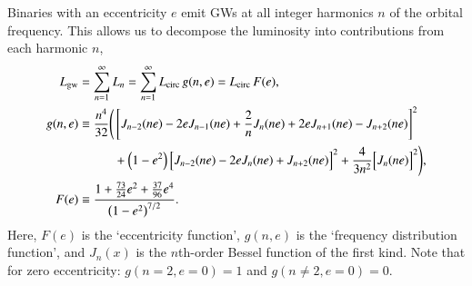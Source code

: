 \documentclass[onecolumn,authoryear]{els-mrw}
\begin{document}
Binaries with an eccentricity $e$ emit GWs at all integer harmonics $n$ of the orbital frequency.  This allows us to decompose the luminosity into contributions from each harmonic $n$,
\begin{subequations}
\begin{align}
    \lumgw & = \sum_{n=1}^\infty L_n = \sum_{n=1}^\infty \lgwcirc \, g(n,e) = \lgwcirc \, F(e), \\
    g(n,e) & \equiv \frac{n^4}{32} \Biggl(
        \begin{aligned}[t]
            & \left[ J_{n-2}(ne) - 2eJ_{n-1}(ne) + \frac{2}{n} J_n (ne) + 2e J_{n+1} (ne) - J_{n+2} (ne) \vphantom{\frac{2}{n}}\right]^2 \\
            & + \left(1-e^2\right) \Bigl[J_{n-2}(ne) - 2eJ_n(ne) + J_{n+2}(ne)\Bigr]^2 + \frac{4}{3n^2}\Bigl[J_n(ne)\Bigr]^2 \Biggr),
        \end{aligned} \\
    F(e) & \equiv \frac{1 + \frac{73}{24} e^2 + \frac{37}{96} e^4}{\left( 1 - e^2\right)^{7/2}}.
\end{align}
\end{subequations}
Here, $F(e)$ is the `eccentricity function', $g(n,e)$ is the `frequency distribution function', and $J_n(x)$ is the $n$th-order Bessel function of the first kind.  Note that for zero eccentricity: $g(n\!=\!2,e\!=\!0) = 1$ and $g(n\!\neq\!2, e\!=\!0) = 0$.
\end{document}
